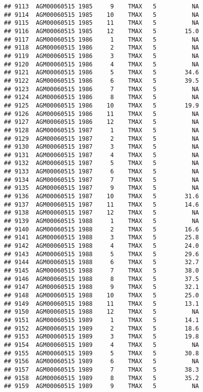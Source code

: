 \documentclass{article}\usepackage[]{graphicx}\usepackage[]{color}
\makeatletter
\newenvironment{kframe}{%
 \def\at@end@of@kframe{}%
 \ifinner\ifhmode%
  \def\at@end@of@kframe{\end{minipage}}%
  \begin{minipage}{\columnwidth}%
 \fi\fi%
 \def\FrameCommand##1{\hskip\@totalleftmargin \hskip-\fboxsep
 \colorbox{shadecolor}{##1}\hskip-\fboxsep
     \hskip-\linewidth \hskip-\@totalleftmargin \hskip\columnwidth}%
 \MakeFramed {\advance\hsize-\width
   \@totalleftmargin\z@ \linewidth\hsize
   \@setminipage}}%
 {\par\unskip\endMakeFramed%
 \at@end@of@kframe}
\newenvironment{knitrout}{}{} %
\makeatother
\begin{document}
\begin{knitrout}
\begin{kframe}
\begin{verbatim}
## 9113  AGM00060515 1985     9    TMAX   5          NA
## 9114  AGM00060515 1985    10    TMAX   5          NA
## 9115  AGM00060515 1985    11    TMAX   5          NA
## 9116  AGM00060515 1985    12    TMAX   5        15.0
## 9117  AGM00060515 1986     1    TMAX   5          NA
## 9118  AGM00060515 1986     2    TMAX   5          NA
## 9119  AGM00060515 1986     3    TMAX   5          NA
## 9120  AGM00060515 1986     4    TMAX   5          NA
## 9121  AGM00060515 1986     5    TMAX   5        34.6
## 9122  AGM00060515 1986     6    TMAX   5        39.5
## 9123  AGM00060515 1986     7    TMAX   5          NA
## 9124  AGM00060515 1986     8    TMAX   5          NA
## 9125  AGM00060515 1986    10    TMAX   5        19.9
## 9126  AGM00060515 1986    11    TMAX   5          NA
## 9127  AGM00060515 1986    12    TMAX   5          NA
## 9128  AGM00060515 1987     1    TMAX   5          NA
## 9129  AGM00060515 1987     2    TMAX   5          NA
## 9130  AGM00060515 1987     3    TMAX   5          NA
## 9131  AGM00060515 1987     4    TMAX   5          NA
## 9132  AGM00060515 1987     5    TMAX   5          NA
## 9133  AGM00060515 1987     6    TMAX   5          NA
## 9134  AGM00060515 1987     7    TMAX   5          NA
## 9135  AGM00060515 1987     9    TMAX   5          NA
## 9136  AGM00060515 1987    10    TMAX   5        31.6
## 9137  AGM00060515 1987    11    TMAX   5        14.6
## 9138  AGM00060515 1987    12    TMAX   5          NA
## 9139  AGM00060515 1988     1    TMAX   5          NA
## 9140  AGM00060515 1988     2    TMAX   5        16.6
## 9141  AGM00060515 1988     3    TMAX   5        25.8
## 9142  AGM00060515 1988     4    TMAX   5        24.0
## 9143  AGM00060515 1988     5    TMAX   5        29.6
## 9144  AGM00060515 1988     6    TMAX   5        32.7
## 9145  AGM00060515 1988     7    TMAX   5        38.0
## 9146  AGM00060515 1988     8    TMAX   5        37.5
## 9147  AGM00060515 1988     9    TMAX   5        32.1
## 9148  AGM00060515 1988    10    TMAX   5        25.0
## 9149  AGM00060515 1988    11    TMAX   5        13.1
## 9150  AGM00060515 1988    12    TMAX   5          NA
## 9151  AGM00060515 1989     1    TMAX   5        14.1
## 9152  AGM00060515 1989     2    TMAX   5        18.6
## 9153  AGM00060515 1989     3    TMAX   5        19.8
## 9154  AGM00060515 1989     4    TMAX   5          NA
## 9155  AGM00060515 1989     5    TMAX   5        30.8
## 9156  AGM00060515 1989     6    TMAX   5          NA
## 9157  AGM00060515 1989     7    TMAX   5        38.3
## 9158  AGM00060515 1989     8    TMAX   5        35.2
## 9159  AGM00060515 1989     9    TMAX   5          NA

\end{verbatim}
\end{kframe}
\end{knitrout}
\end{document}
